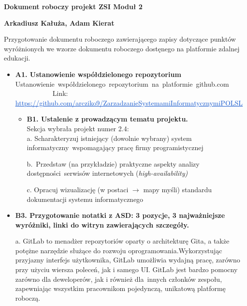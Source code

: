 \documentclass[12pt]{article}
\renewcommand{\_}{\kern-1.5pt\textunderscore\kern-1.5pt}
\begin{document}
\textbf{Dokument roboczy projekt ZSI Moduł 2}\par


\vspace{\baselineskip}
\textbf{Arkadiusz Kałuża, Adam Kierat}\par


\vspace{\baselineskip}
Przygotowanie dokumentu roboczego zawierającego zapisy dotyczące punktów wyróżnionych we wzorze dokumentu roboczego dostęnego na platformie zdalnej edukacji.\par


\vspace{\baselineskip}
\begin{itemize}
	\item \textbf{A1. Ustanowienie współdzielonego repozytorium}\\
Ustanowienie\ współdzielonego\ repozytorium\ na\ platformie\ github.com\ \ \ \ \ \ \ \ \ \ \ \ \ \ \ \       Link: \href{https://github.com/arcziko9/ZarzadzanieSystemamiInformatycznymiPOLSL}{\textcolor[HTML]{1155CC}{\ul{https://github.com/arcziko9/ZarzadzanieSystemamiInformatycznymiPOLSL}}}\\
\par

\begin{itemize}
	\item \textbf{B1. Ustalenie z prowadzącym tematu projektu.}\\
Sekcja wybrała projekt numer 2.4:\\
 a. Scharakteryzuj istniejący (dowolnie wybrany) system informatyczny wspomagający pracę firmy programistycznej \par

b. Przedstaw (na przykładzie) praktyczne aspekty analizy dostępności serwisów internetowych (\textit{high-availability)} \par

c. Opracuj wizualizację (w postaci $ \rightarrow $ mapy myśli) standardu dokumentacji systemu informatycznego \par


\end{itemize}
	\item \textbf{B3. Przygotowanie notatki z ASD: 3 pozycje, 3 najważniejsze wyróżniki, linki do witryn zawierających szczegóły.}\par

a. GitLab to menadżer repozytoriów oparty o architekturę Gita, a także potężne narzędzie służące do rozwoju oprogramowania.Wykorzystując przyjazny interfejs użytkownika, GitLab umożliwia wydajną pracę, zarówno przy użyciu wiersza poleceń, jak i samego UI. GitLab jest bardzo pomocny zarówno dla deweloperów, jak i również dla innych członków zespołu, zapewniając wszystkim pracownikom pojedynczą, unikatową platformę roboczą.\par


\end{itemize}
\end{document}
